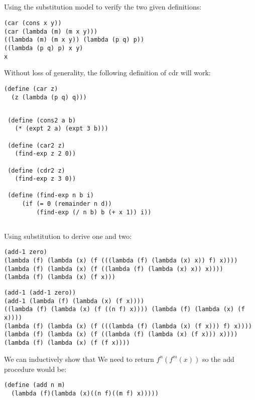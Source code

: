\documentclass{article}
\begin{document}
\subsection{}
Using the substitution model to verify the two given definitions:
\begin{verbatim}(car (cons x y)) 
(car (lambda (m) (m x y))) 
((lambda (m) (m x y)) (lambda (p q) p)) 
((lambda (p q) p) x y) 
x
\end{verbatim}
 Without loss of generality, the following definition of cdr will work:
 \begin{verbatim}
(define (car z) 
  (z (lambda (p q) q)))
\end{verbatim}

\subsection{}

 \begin{verbatim}
 (define (cons2 a b) 
   (* (expt 2 a) (expt 3 b)))

 (define (car2 z) 
   (find-exp z 2 0))

 (define (cdr2 z) 
   (find-exp z 3 0))

 (define (find-exp n b i) 
     (if (= 0 (remainder n d)) 
         (find-exp (/ n b) b (+ x 1)) i)) 
\end{verbatim}
\subsection{}
Using substitution to derive one and two:
\begin{verbatim}
(add-1 zero)
(lambda (f) (lambda (x) (f (((lambda (f) (lambda (x) x)) f) x))))
(lambda (f) (lambda (x) (f ((lambda (f) (lambda (x) x)) x))))
(lambda (f) (lambda (x) (f x)))
\end{verbatim}
\begin{verbatim}
(add-1 (add-1 zero))
(add-1 (lambda (f) (lambda (x) (f x))))
((lambda (f) (lambda (x) (f ((n f) x)))) (lambda (f) (lambda (x) (f x))))
(lambda (f) (lambda (x) (f (((lambda (f) (lambda (x) (f x))) f) x))))
(lambda (f) (lambda (x) (f ((lambda (f) (lambda (x) (f x))) x))))
(lambda (f) (lambda (x) (f (f x))))
\end{verbatim}
We can inductively show that We need to return $f^n(f^m(x))$ so the add procedure would be:
\begin{verbatim}
(define (add n m)
  (lambda (f)(lambda (x)((n f)((m f) x))))) 
\end{verbatim}
\end{document}
